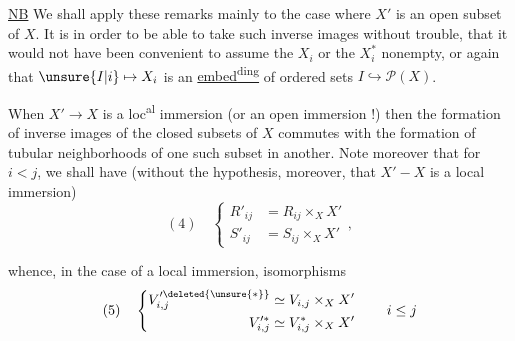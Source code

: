 \uline{NB} We shall apply these remarks mainly to the
case where $X'$ is an open subset of $X$. It is in order
to be able to take such inverse images without
trouble, that it would not have been convenient
to assume the $X_i$ or the $X_i^*$ nonempty,
or again that $\unsure{I|i}\mapsto X_i$ is an \uline{embed\textsuperscript{ding}}
of ordered sets $I\hookrightarrow\mathcal P(X)$.

When $X'\to X$ is a  loc\textsuperscript{al} immersion 
  (or an open immersion !) then
the formation of inverse images of the
 closed subsets of $X$ commutes with the
formation of tubular neighborhoods of
one such subset in another. Note
moreover that for $i<j$, we shall have
(without the hypothesis, moreover, that $X'-X$ is a
local immersion)
\[
(4)\quad\left\{\begin{aligned}
R'_{ij}&=R_{ij}\times_X X'\\
S'_{ij}&=S_{ij}\times_X X'
\end{aligned}\right.,
\]

whence, in the case of a  local immersion,
isomorphisms
\[
(5)\quad\left\{\begin{aligned}
V'^{\deleted{\unsure{*}}}_{i,j}&\simeq V_{i,j}\times_X X'\\
V'^{*}_{i,j}&\simeq V^*_{i,j}\times_X X'
\end{aligned}\right.\qquad i\leq j
\]

